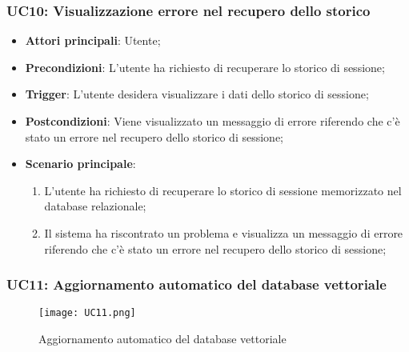\subsubsection{UC10: Visualizzazione errore nel recupero dello storico}
\begin{itemize}
    \item \textbf{Attori principali}: Utente;
    \item \textbf{Precondizioni}: L'utente ha richiesto di recuperare lo storico di sessione;
    \item \textbf{Trigger}: L'utente desidera visualizzare i dati dello storico di sessione;
    \item \textbf{Postcondizioni}: Viene visualizzato un messaggio di errore riferendo che c'è stato un errore nel recupero dello storico di sessione;
    \item \textbf{Scenario principale}: 
    \begin{enumerate}
        \item L'utente ha richiesto di recuperare lo storico di sessione memorizzato nel database relazionale;
        \item Il sistema ha riscontrato un problema e visualizza un messaggio di errore riferendo che c'è stato un errore nel recupero dello storico di sessione;
    \end{enumerate}
\end{itemize}


\hypertarget{UC11}{}
\subsubsection{UC11: Aggiornamento automatico del database vettoriale}

\begin{figure}[h]
    \centering
    \texttt{[image: UC11.png]}
    \caption{Aggiornamento automatico del database vettoriale}
\end{figure}


